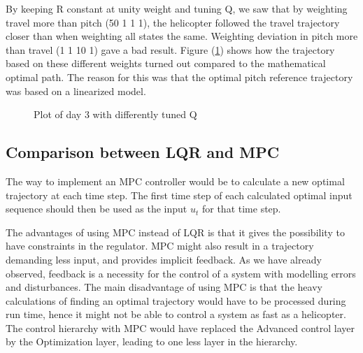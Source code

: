 By keeping R constant at unity weight and tuning Q, we saw that by weighting travel more than pitch (50 1 1 1), the helicopter followed the travel trajectory closer than when weighting all states the same. Weighting deviation in pitch more than travel (1 1 10 1) gave a bad result. Figure (\ref{fig:day3_plot_allQ}) shows how the trajectory based on these different weights turned out compared to the mathematical optimal path. The reason for this was that the optimal pitch reference trajectory was based on a linearized model.
\begin{figure}[htb]
	\centering
	\caption{Plot of day 3 with differently tuned Q}
	\label{fig:day3_plot_allQ}
\end{figure}




\subsection{Comparison between LQR and MPC}
The way to implement an MPC controller would be to calculate a new optimal trajectory at each time step. The first time step of each calculated optimal input sequence should then be used as the input $u_t$ for that time step.

The advantages of using MPC instead of LQR is that it gives the possibility to have constraints in the regulator. MPC might also result in a trajectory demanding less input, and provides implicit feedback. As we have already observed, feedback is a necessity for the control of a system with modelling errors and disturbances. 
The main disadvantage of using MPC is that the heavy calculations of finding an optimal trajectory would have to be processed during run time, hence it might not be able to control a system as fast as a helicopter.
The control hierarchy with MPC would have replaced the Advanced control layer by the Optimization layer, leading to one less layer in the hierarchy.

